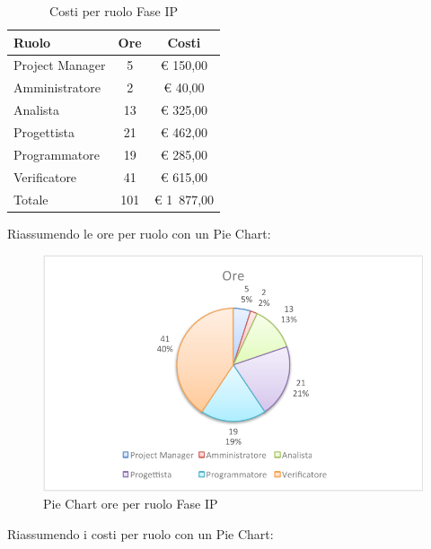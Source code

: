 				\begin{table}[H]
					\begin{center}
						\begin{tabular}{| l | c | c |}
							\hline
							Ruolo 				& Ore 		& Costi  \\ \hline
							
							Project Manager		& 5 		& \euro{} 150,00 	\\
							Amministratore 		& 2 		& \euro{} 40,00 	\\
							Analista	 		& 13 		& \euro{} 325,00 	\\
							Progettista 		& 21 		& \euro{} 462,00  	\\
							Programmatore		& 19		& \euro{} 285,00 	\\
							Verificatore		& 41 		& \euro{} 615,00 	\\ \hline \hline
								
							Totale	 			& 101 		& \euro{} 1~877,00 	\\ \hline
						\end{tabular}
					\end{center}
					\caption{Costi per ruolo Fase IP}
				\end{table}
				Riassumendo le ore per ruolo con un Pie Chart:
				\begin{figure}[H]\centering
					\includegraphics[width=\textwidth]{PianoDiProgetto/Pics/ChartTotOreFaseIP.pdf}
					\caption{Pie Chart ore per ruolo Fase IP}
				\end{figure}
				Riassumendo i costi per ruolo con un Pie Chart:
